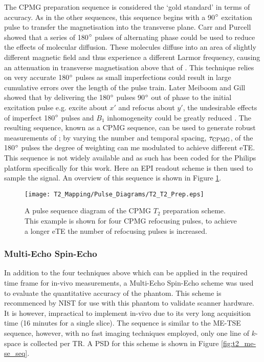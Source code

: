 The \ac{CPMG} \ttwo preparation sequence is considered the `gold standard' in terms of accuracy. As in the other sequences, this sequence begins with a 90$\degree$ excitation pulse to transfer the magnetisation into the transverse plane. Carr and Purcell showed that a series of 180$\degree$ pulses of alternating phase could be used to reduce the effects of molecular diffusion. These molecules diffuse into an area of slightly different magnetic field and thus experience a different Larmor frequency, causing an attenuation in transverse magnetisation above that of \ttwo \cite{carr_effects_1954}. This technique relies on very accurate 180$\degree$ pulses as small imperfections could result in large cumulative errors over the length of the pulse train. Later Meiboom and Gill showed that by delivering the 180$\degree$ pulses 90$\degree$ out of phase to the initial excitation pulse e.g. excite about $x'$ and refocus about $y'$, the undesirable effects of imperfect 180$\degree$ pulses and $B_1$ inhomogeneity could be greatly reduced \cite{meiboom_modified_1958}. The resulting sequence, known as a \acf{CPMG} sequence, can be used to generate robust measurements of \ttwo; by varying the number and temporal spacing, $\tau_{\textup{CPMG}}$, of the 180$\degree$ pulses the degree of \ttwo weighting can me modulated to achieve different \ac{eTE}. This sequence is not widely available and as such has been coded for the Philips platform specifically for this work. Here an \ac{EPI} readout scheme is then used to sample the signal. An overview of this sequence is shown in Figure \ref{fig:t2_cpmg_t2prep_seq}.

\begin{figure}[H]
	\centering
	\texttt{[image: T2\_Mapping/Pulse\_Diagrams/T2\_T2\_Prep.eps]}
	\caption{A pulse sequence diagram of the \ac{CPMG} $T_2$ preparation scheme. This example is shown for four \ac{CPMG} refocusing pulses, to achieve a longer \ac{eTE} the number of refocusing pulses is increased.}
	\label{fig:t2_cpmg_t2prep_seq}	
\end{figure}

\subsubsection{Multi-Echo Spin-Echo}
In addition to the four techniques above which can be applied in the required time frame for in-vivo measurements, a Multi-Echo Spin-Echo scheme was used to evaluate the quantitative accuracy of the phantom. This scheme is recommenced by \ac{NIST} for use with this phantom to validate scanner hardware. It is however, impractical to implement in-vivo due to its very long acquisition time (16 minutes for a single slice). The sequence is similar to the \ac{ME-TSE} sequence, however, with no fast imaging techniques employed, only one line of $k$-space is collected per \ac{TR}. A \ac{PSD} for this scheme is shown in Figure \ref{fig:t2_me-se_seq}.

